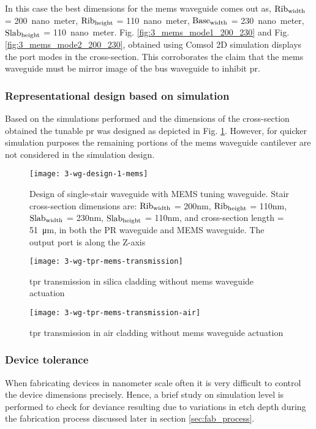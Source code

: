 \documentclass[../report.tex]{subfiles}
\begin{document}
In this case the best dimensions for the \gls{mems} waveguide comes out as, $\mathrm{Rib_{width}}$ = \SI{200}{nano meter}, $\mathrm{Rib_{height}}$ = \SI{110}{nano meter}, $\mathrm{Base_{width}}$ = \SI{230}{nano meter}, $\mathrm{Slab_{height}}$ = \SI{110}{nano meter}. Fig. \ref{fig:3_mems_mode1_200_230} and Fig. \ref{fig:3_mems_mode2_200_230}, obtained using Comsol 2D simulation displays the port modes in the cross-section. This corroborates the claim that the \gls{mems} waveguide must be mirror image of the bus waveguide to inhibit \gls{pr}.

\subsubsection{Representational design based on simulation}			
Based on the simulations performed and the dimensions of the cross-section obtained the tunable \gls{pr} was designed as depicted in Fig. \ref{fig:3_wg_design_1_mems}. However, for quicker simulation purposes the remaining portions of the \gls{mems} waveguide cantilever are not considered in the simulation design.  

\begin{figure}[H] %
	\centering
	\texttt{[image: 3-wg-design-1-mems]}
	\caption{Design of single-stair waveguide with MEMS tuning waveguide. Stair cross-section dimensions are: $\mathrm{Rib_{width}}$ = 200nm, $\mathrm{Rib_{height}}$ = 110nm, $\mathrm{Slab_{width}}$ = 230nm, $\mathrm{Slab_{height}}$ = 110nm, and cross-section length = \SI{51}{\micro\meter}, in both the PR waveguide and MEMS waveguide. The output port is along the Z-axis}
	\label{fig:3_wg_design_1_mems}
\end{figure}

\begin{figure}[H] %
	\centering
	\texttt{[image: 3-wg-tpr-mems-transmission]}
	\caption{\gls{tpr} transmission in silica cladding without \gls{mems} waveguide actuation}
	\label{fig:3_wg_tpr_mems_transmission}
\end{figure}

\begin{figure}[H] %
	\centering
	\texttt{[image: 3-wg-tpr-mems-transmission-air]}
	\caption{\gls{tpr} transmission in air cladding without \gls{mems} waveguide actuation}
	\label{fig:3_wg_tpr_mems_transmission_air}
\end{figure}

\subsubsection{Device tolerance}
When fabricating devices in nanometer scale often it is very difficult to control the device dimensions precisely. Hence, a brief study on simulation level is performed to check for deviance resulting due to variations in etch depth during the fabrication process discussed later in section \ref{sec:fab_process}.\\  
\end{document}

